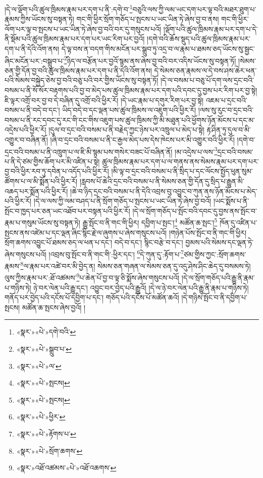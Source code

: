 །དེ་ལ་ལྡོག་པའི་ཚུལ་ཁྲིམས་རྣམ་པར་དག་པ་ནི་:དགེ་བ་\footnote{«སྣར་»«པེ་»དགེ་བའི་}བཅུའི་ལས་ཀྱི་ལམ་ཡང་དག་པར་ལྟ་བའི་མཐར་ཐུག་པ་རྣམས་ཀྱིས་ཡོངས་སུ་བསྟན་ཏེ། གང་གི་ཕྱིར་སྲོག་གཅོད་པ་སྤངས་པ་ཡང་ཡིན་ཏེ་ཞེས་བྱ་བ་ནས། གང་གི་ཕྱིར་ལོག་པར་ལྟ་བ་སྤངས་པ་ཡང་ཡིན་ཏེ་ཞེས་བྱ་བའི་བར་དུ་གསུངས་པའོ། །ལྡོག་པའི་ཚུལ་ཁྲིམས་རྣམ་པར་དག་པ་དེ་ནི་སྡོམ་པའི་ཚུལ་ཁྲིམས་རྣམ་པར་དག་པར་ཡང་རིག་པར་བྱའོ། །དགེ་བའི་ཆོས་སྡུད་པའི་ཚུལ་ཁྲིམས་རྣམ་པར་དག་པ་ནི་དེའི་འོག་ནས། དེ་ལྟ་བས་ན་བདག་གིས་མངོན་པར་སྒྲུབ་ཏུ་འདྲ་བ་ལ་རྣམ་པ་ཐམས་ཅད་ཡོངས་སུ་སྦྱང་ཞིང་མངོན་པར་:བསྒྲུབ་པ་\footnote{«སྣར་»«པེ་»སྒྲུབ་པ་}ཉིད་ལ་བརྩོན་པར་བྱའོ་སྙམ་ནས་ཞེས་བྱ་བའི་བར་འདིས་ཡོངས་སུ་བསྟན་ཏོ། །སེམས་ཅན་གྱི་དོན་བྱ་བའི་ཚུལ་ཁྲིམས་རྣམ་པར་དག་པ་ནི་དེའི་འོག་ནས། དེ་སེམས་ཅན་རྣམས་ལ་དེ་བས་ཤས་ཆེར་ཕན་པའི་སེམས་བསྐྱེད་ཅེས་བྱ་བའི་བཅུ་པའི་བར་གྱིས་ཡོངས་སུ་བསྟན་ཏོ། །དེ་ལ་བསམ་པ་བཅུ་པོ་དག་ལས་དྲང་བའི་བསམ་པ་ནི་སོ་སོར་བརྟགས་པའི་བྱ་བ་མེད་པས་ཚུལ་ཁྲིམས་རྣམ་པར་དག་པའི་དབང་དུ་བྱས་པར་རིག་པར་བྱ་སྟེ། ཇི་ལྟར་འགྲོ་བར་བྱ་བ་དེ་བཞིན་དུ་འགྲོ་བའི་ཕྱིར་རོ། །དེ་ཡང་རྣམ་པ་དགུར་རིག་པར་བྱ་སྟེ། འཇམ་པ་དྲང་བའི་བསམ་པ་ནི་བདེ་བ་དང་། ཡིད་བདེ་བ་དང་ལྡན་པས་ཚུལ་ཁྲིམས་ལ་འཇུག་པའི་ཕྱིར་རོ། །ལས་སུ་རུང་བ་དྲང་བའི་བསམ་པ་ནི་རང་དབང་དུ་རང་གི་ངང་གིས་འཇུག་པས་ཚུལ་ཁྲིམས་ཀྱི་མི་མཐུན་པའི་ཕྱོགས་ཉོན་མོངས་པ་དང་མ་འདྲེས་པའི་ཕྱིར་རོ། །དུལ་བ་དྲང་བའི་བསམ་པ་ནི་བརྗེད་ཀྱང་ཉེས་པར་འཁྲུལ་པ་མེད་པ་སྟེ། རྟ་ཤིན་ཏུ་དུལ་བ་མི་འགྱུར་བ་བཞིན་ནོ། །ཞི་བ་དྲང་བའི་བསམ་པ་ནི་ང་རྒྱལ་མེད་པས་དེས་ཁེངས་པར་མི་འགྱུར་བའི་ཕྱིར་རོ། །དགེ་བ་དྲང་བའི་བསམ་པ་ནི་འཁྲུག་པ་ལ་ཇི་མི་སྙམ་པས་གསེར་བཟང་པོ་བཞིན་ནོ། །མ་འདྲེས་པ་ལས་\footnote{«སྣར་»«པེ་»ལ་}དྲང་བའི་བསམ་པ་ནི་དེ་ཙམ་གྱིས་ཆོག་པར་མི་འཛིན་པ་སྟེ། ཚུལ་ཁྲིམས་རྣམ་པར་དག་པ་ལ་གནས་ནས་སེམས་རྣམ་པར་དག་པར་བྱ་བའི་ཕྱིར་རབ་ཏུ་དབེན་པ་འདོད་པའི་ཕྱིར་རོ། །མི་ལྟ་བ་དྲང་བའི་བསམ་པ་ནི་སྲིད་པ་དང་ལོངས་སྤྱོད་ཕུན་སུམ་ཚོགས་པ་ལ་མི་སྨོན་པའི་ཕྱིར་རོ། །རླབས་པོ་ཆེའི་དྲང་བའི་བསམ་པ་ནི་སེམས་ཅན་གྱི་དོན་དུ་སྲིད་པ་རྒྱུན་མི་འཆད་པར་སྨོན་པའི་ཕྱིར་རོ། །ཆེ་བ་ཉིད་དྲང་བའི་བསམ་པ་ནི་དེའི་འབྲས་བུ་འབྱུང་བ་ཀུན་ནས་ཉོན་མོངས་པ་མེད་པའི་ཕྱིར་རོ། །དེ་ལ་ལས་ཀྱི་ལམ་བཤད་པ་ནི་སྲོག་གཅོད་པ་སྤངས་པ་ཡང་ཡིན་ཏེ་ཞེས་བྱ་བའོ། །ཡང་སྨོས་པ་ནི་སྤོང་བ་ཁྱད་པར་ཅན་ཡང་འཐོབ་པར་བསྟན་པའི་ཕྱིར་རོ། །དེ་ལ་སྲོག་གཅོད་པ་སྤོང་བའི་དབང་དུ་བྱས་ནས་སྤོང་བ་རྣམ་པ་གསུམ་ཡོངས་སུ་བསྟན་ཏེ། རྒྱུ་སྤོང་བ་ནི་གང་གི་ཕྱིར། དབྱིག་པ་སྤང་།\footnote{«སྣར་»«པེ་»སྤངས།} མཚོན་ཆ་སྤང་།\footnote{«སྣར་»«པེ་»སྤངས།} ཁོན་དུ་འཛིན་པ་སྤངས་ནས་འཛེམ་པ་དང་ལྡན་ཞིང་སྙིང་རྗེ་ལ་ཞུགས་པ་ཞེས་གསུངས་པའོ། །གཉེན་པོས་སྤོང་བ་ནི་གང་གི་ཕྱིར། སྲོག་ཆགས་འབྱུང་པོ་ཐམས་ཅད་ལ་ཕན་པ་དང་། བདེ་བ་དང་། སྙིང་བརྩེ་བ་དང་། བྱམས་པའི་སེམས་དང་ལྡན་ཏེ་ཞེས་གསུངས་པའོ། །འབྲས་བུ་སྤོང་བ་ནི་གང་གི་:ཕྱིར་དང་། \footnote{«སྣར་»«པེ་»ཕྱིར་}དེ་ཀུན་དུ་:རྟོག་པ་\footnote{«སྣར་»«པེ་»རྟོགས་པ་}ཙམ་གྱིས་ཀྱང་:སྲོག་ཆགས་རྣམས་\footnote{«སྣར་»«པེ་»སྲོག་ཆགས་}ལ་རྣམ་པར་འཚེ་བར་མི་བྱེད་ན། སེམས་ཅན་གཞན་ལ་སེམས་ཅན་དུ་འདུ་ཤེས་ཤིང་ཆེད་དུ་བསམས་ཏེ། ལུས་ཀྱིས་རྣམ་པར་:ཐོ་འཚམས་\footnote{«སྣར་»འཐོ་འཚམས་«པེ་»འཐོ་འཆགས་}པ་ཆེན་པོ་བྱ་བ་ལྟ་ཅི་སྨོས་ཞེས་གསུངས་པའོ། །དེ་ལ་སྲོག་གཅོད་པའི་རྒྱུ་ནི་རྣམ་པ་གཉིས་ཏེ། ཉེ་བར་ལེན་པའི་རྒྱུ་དང་། འབྱུང་བར་བྱེད་པའི་རྒྱུའོ། །དེ་ལ་ཉེ་བར་ལེན་པའི་རྒྱུ་ནི་རྣམ་པ་གཉིས་ཏེ། གནོད་པར་བྱེད་པའི་དངོས་པོ་དབྱིག་པ་དང་། གཅོད་པའི་དངོས་པོ་མཚོན་ཆའོ། །དེ་གཉིས་སྤོང་བ་ནི་དབྱིག་པ་སྤངས། མཚོན་ཆ་སྤངས་ཞེས་བྱའོ། །
